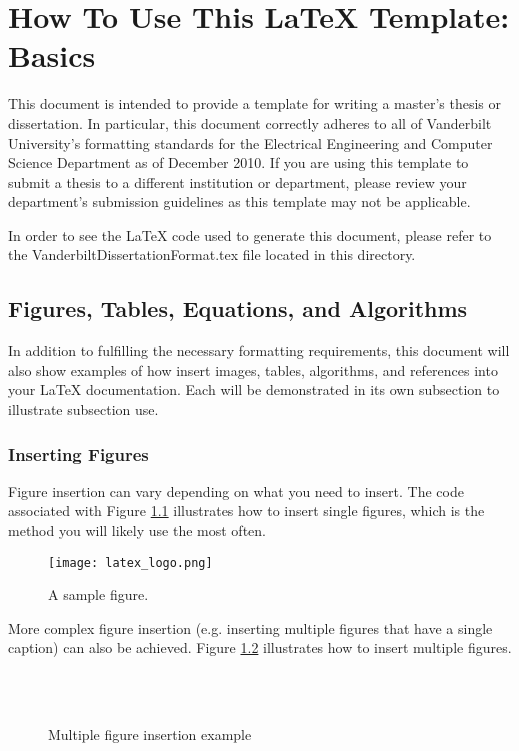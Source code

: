 \chapter{How To Use This LaTeX Template: Basics}
    This document is intended to provide a template for writing a master's thesis or dissertation. In particular, this document correctly adheres to all of Vanderbilt University's formatting standards for the Electrical Engineering and Computer Science Department as of December 2010. If you are using this template to submit a thesis to a different institution or department, please review your department's submission guidelines as this template may not be applicable.
    
    In order to see the LaTeX code used to generate this document, please refer to the VanderbiltDissertationFormat.tex file located in this directory. 

\section{Figures, Tables, Equations, and Algorithms}
    In addition to fulfilling the necessary formatting requirements, this document will also show examples of how insert images, tables, algorithms, and references into your LaTeX documentation. Each will be demonstrated in its own subsection to illustrate subsection use.

\subsection{Inserting Figures}
    Figure insertion can vary depending on what you need to insert. The code associated with Figure \ref{fig:texlogo} illustrates how to insert single figures, which is the method you will likely use the most often. 

\begin{figure}
\centering
\texttt{[image: latex\_logo.png]}
\caption{A sample figure.}
\label{fig:texlogo}
\end{figure}

More complex figure insertion (e.g. inserting multiple figures that have a single caption) can also be achieved. Figure \ref{fig:testedShapes} illustrates how to insert multiple figures.

\begin{figure}[htp]
  \begin{center}
    \\
    \\
 \end{center}
  \caption{Multiple figure insertion example}
  \label{fig:testedShapes}
\end{figure}


